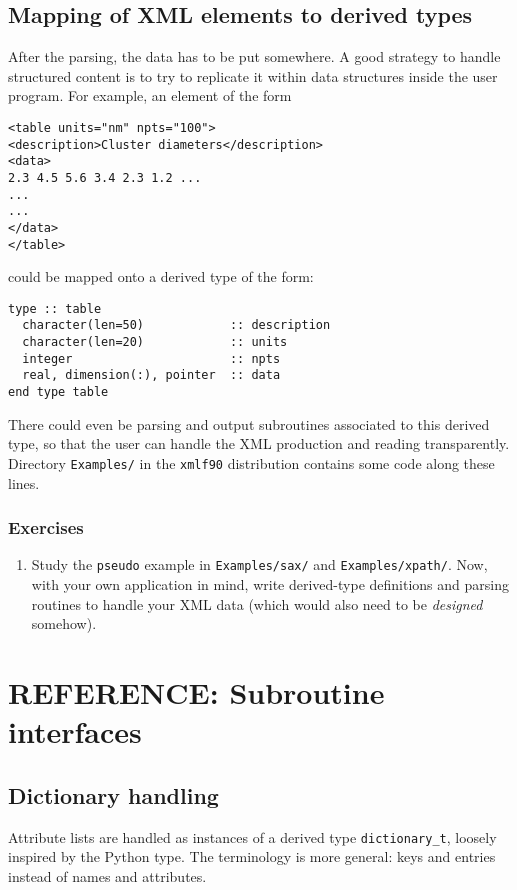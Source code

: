 \documentclass[11pt]{article}
\begin{document}
\subsection{Mapping of XML elements to derived types}

After the parsing, the data has to be put somewhere. A good strategy
to handle structured content is to try to replicate it within data
structures inside the user program. For example, an element of the
form
%
\begin{verbatim}
<table units="nm" npts="100">
<description>Cluster diameters</description>
<data>
2.3 4.5 5.6 3.4 2.3 1.2 ...
...
...
</data>
</table>
\end{verbatim}
%
could be mapped onto a derived type of the form:
%
\begin{verbatim}
type :: table
  character(len=50)            :: description
  character(len=20)            :: units
  integer                      :: npts
  real, dimension(:), pointer  :: data
end type table
\end{verbatim}
%
There could even be parsing and output subroutines associated to this
derived type, so that the user can handle the XML production and
reading transparently. Directory \texttt{Examples/} in the
\texttt{xmlf90} distribution contains some code along these lines.

\subsubsection{Exercises}
%
\begin{enumerate}
\item Study the \texttt{pseudo} example in \texttt{Examples/sax/} and
\texttt{Examples/xpath/}. Now, with your own application in mind,
write derived-type definitions and parsing routines to handle your XML
data (which would also need to be \textsl{designed} somehow).

\end{enumerate}
%


\section{REFERENCE: Subroutine interfaces}
\label{sec:reference}

\subsection{Dictionary handling}

Attribute lists are handled as instances of a derived type
\texttt{dictionary\_t}, loosely inspired by the Python type.  The
terminology is more general: keys and entries instead of names and
attributes.
\end{document}
